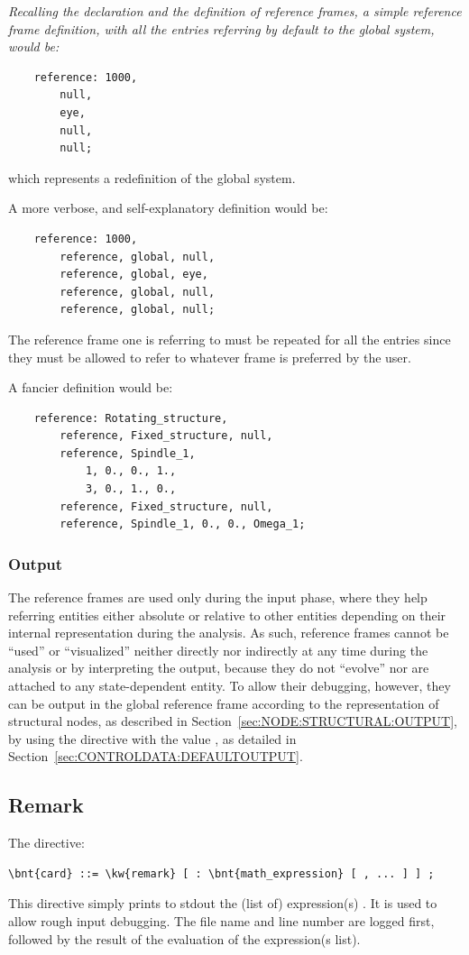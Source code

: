{\em
    Recalling the declaration and the definition of reference frames,
    a simple reference frame definition, with all the entries referring 
    by default to the global system, would be:
    \begin{verbatim}
    reference: 1000,
        null,
        eye,
        null,
        null;
    \end{verbatim}
    which represents a redefinition of the global system.

    A more verbose, and self-explanatory definition would be:
    \begin{verbatim}
    reference: 1000,
        reference, global, null,
        reference, global, eye,
        reference, global, null,
        reference, global, null;			 
    \end{verbatim}
    The reference frame one is referring to must be repeated for all the entries
    since they must be allowed to refer to whatever frame is preferred 
    by the user.

    A fancier definition would be:
    \begin{verbatim}
    reference: Rotating_structure, 
        reference, Fixed_structure, null,
        reference, Spindle_1,
            1, 0., 0., 1., 
            3, 0., 1., 0.,
        reference, Fixed_structure, null,
        reference, Spindle_1, 0., 0., Omega_1;
    \end{verbatim}
}

\subsubsection{Output}
The reference frames are used only during the input phase, 
where they help referring entities either absolute 
or relative to other entities depending on their internal representation
during the analysis.
As such, reference frames cannot be ``used'' or ``visualized'' neither 
directly nor indirectly at any time during the analysis or by interpreting
the output, because they do not ``evolve'' nor are attached
to any state-dependent entity.
To allow their debugging, however, they can be output in the global
reference frame according to the representation of structural nodes,
as described in Section~\ref{sec:NODE:STRUCTURAL:OUTPUT}, 
by using the  directive 
with the value , as detailed
in Section~\ref{sec:CONTROLDATA:DEFAULTOUTPUT}.



\subsection{Remark}
The  directive:
\begin{Verbatim}[commandchars=\\\{\}]
    \bnt{card} ::= \kw{remark} [ : \bnt{math_expression} [ , ... ] ] ;
\end{Verbatim}
This directive simply prints to stdout the (list of) expression(s) .
It is used to allow rough input debugging. The file name and line number
are logged first, followed by the result of the evaluation of the expression(s list). 

